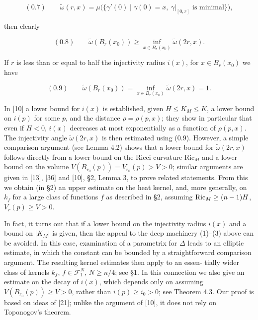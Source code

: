 \begin{equation}
(0.7)\qquad \widetilde{\omega}(r,x)=\mu\bigl(\{\gamma'(0)\mid \gamma(0)=x,\ \gamma|_{[0,r]}\text{ is minimal}\}\bigr),
\end{equation}

then clearly

\begin{equation}
(0.8)\qquad \widetilde{\omega}(B_r(x_0)) \ge \inf_{x\in B_r(x_0)} \widetilde{\omega}(2r,x).
\end{equation}

If $r$ is less than or equal to half the injectivity radius $i(x)$, for $x \in B_r(x_0)$ we
have

\begin{equation}
(0.9)\qquad \widetilde{\omega}(B_r(x_0)) = \inf_{x\in B_r(x_0)} \widetilde{\omega}(2r,x)=1.
\end{equation}

In [10] a lower bound for $i(x)$ is established, given $H \le K_M \le K$, a lower
bound on $i(p)$ for some $p$, and the distance $\rho=\rho(p,x)$; they show in
particular that even if $H<0$, $i(x)$ decreases at most exponentially as a
function of $\rho(p,x)$. The injectivity angle $\widetilde{\omega}(2r,x)$ is then estimated using (0.9).
However, a simple comparison argument (see Lemma 4.2) shows that a lower
bound for $\widetilde{\omega}(2r,x)$ follows directly from a lower bound on the Ricci curvature
Ric$_M$ and a lower bound on the volume $V(B_{r_0}(p)) = V_{r_0}(p) > V > 0$; similar
arguments are given in [13], [36] and [10], \S2, Lemma 3, to prove related
statements. From this we obtain (in \S2) an upper estimate on the heat kernel,
and, more generally, on $k_f$ for a large class of functions $f$ as described in \S2,
assuming $\operatorname{Ric}_M \geq (n - 1)H$, $V_r(p) \geq V > 0$.

In fact, it turns out that if a lower bound on the injectivity radius $i(x)$ and a
bound on $|K_M|$ is given, then the appeal to the deep machinery (1)--(3) above
can be avoided. In this case, examination of a parametrix for $\Delta$ leads to an
elliptic estimate, in which the constant can be bounded by a straightforward
comparison argument. The resulting kernel estimates then apply to an essen-
tially wider class of kernels $k_f$, $f \in \mathcal{F}_1^N$, $N \geq n/4$; see \S1. In this connection we
also give an estimate on the decay of $i(x)$, which depends only on assuming
$V(B_{r_0}(p)) \geq V > 0$, rather than $i(p) \geq i_0 > 0$; see Theorem 4.3. Our proof is
based on ideas of [21]; unlike the argument of [10], it does not rely on
Toponogov's theorem.

